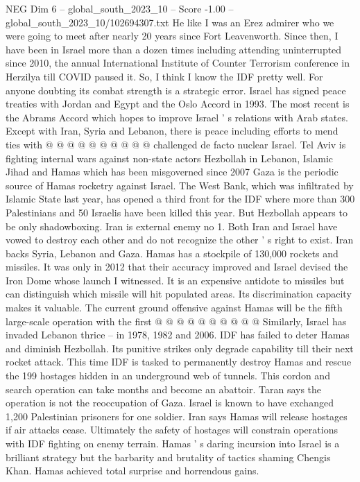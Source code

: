 \begin{textsample}{NEG Dim 6 – global\_south\_2023\_10 – Score -1.00 – global\_south\_2023\_10/102694307.txt}
He like I was an Erez admirer who we were going to meet after nearly 20 years since Fort Leavenworth.
Since then, I have been in Israel more than a dozen times including attending uninterrupted since 2010, the annual International Institute of Counter Terrorism conference in Herzilya till COVID paused it.
So, I think I know the IDF pretty well.
For anyone doubting its combat strength is a strategic error.
Israel has signed peace treaties with Jordan and Egypt and the Oslo Accord in 1993.
The most recent is the Abrams Accord which hopes to improve Israel ' s relations with Arab states.
Except with Iran, Syria and Lebanon, there is peace including efforts to mend ties with @ @ @ @ @ @ @ @ @ @ challenged de facto nuclear Israel.
Tel Aviv is fighting internal wars against non-state actors Hezbollah in Lebanon, Islamic Jihad and Hamas which has been misgoverned since 2007 Gaza is the periodic source of Hamas rocketry against Israel.
The West Bank, which was infiltrated by Islamic State last year, has opened a third front for the IDF where more than 300 Palestinians and 50 Israelis have been killed this year.
But Hezbollah appears to be only shadowboxing.
Iran is external enemy no 1.
Both Iran and Israel have vowed to destroy each other and do not recognize the other ' s right to exist.
Iran backs Syria, Lebanon and Gaza.
Hamas has a stockpile of 130,000 rockets and missiles.
It was only in 2012 that their accuracy improved and Israel devised the Iron Dome whose launch I witnessed.
It is an expensive antidote to missiles but can distinguish which missile will hit populated areas.
Its discrimination capacity makes it valuable.
The current ground offensive against Hamas will be the fifth large-scale operation with the first @ @ @ @ @ @ @ @ @ @ Similarly, Israel has invaded Lebanon thrice -- in 1978, 1982 and 2006.
IDF has failed to deter Hamas and diminish Hezbollah.
Its punitive strikes only degrade capability till their next rocket attack.
This time IDF is tasked to permanently destroy Hamas and rescue the 199 hostages hidden in an underground web of tunnels.
This cordon and search operation can take months and become an abattoir.
Taran says the operation is not the reoccupation of Gaza.
Israel is known to have exchanged 1,200 Palestinian prisoners for one soldier.
Iran says Hamas will release hostages if air attacks cease.
Ultimately the safety of hostages will constrain operations with IDF fighting on enemy terrain.
Hamas ' s daring incursion into Israel is a brilliant strategy but the barbarity and brutality of tactics shaming Chengis Khan.
Hamas achieved total surprise and horrendous gains.

\end{textsample}
